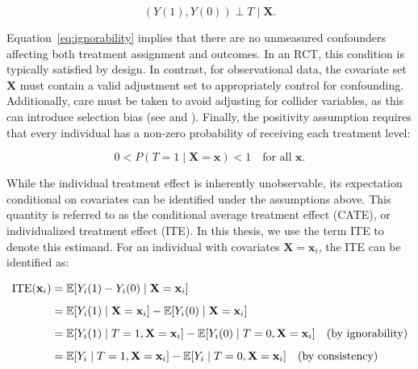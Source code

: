 \begin{equation}
(Y(1), Y(0)) \perp T \mid \mathbf{X}.
\label{eq:ignorability}
\end{equation}

Equation~\ref{eq:ignorability} implies that there are no unmeasured confounders affecting both treatment assignment and outcomes. In an RCT, this condition is typically satisfied by design. In contrast, for observational data, the covariate set $\mathbf{X}$ must contain a valid adjustment set to appropriately control for confounding. Additionally, care must be taken to avoid adjusting for collider variables, as this can introduce selection bias (see \citet{elwert2014} and \citet{hernan2025}). Finally, the positivity assumption requires that every individual has a non-zero probability of receiving each treatment level:

\begin{equation}
0 < P(T = 1 \mid \mathbf{X} = \mathbf{x}) < 1 \quad \text{for all } \mathbf{x}.
\end{equation}

\medskip

While the individual treatment effect is inherently unobservable, its expectation conditional on covariates can be identified under the assumptions above. This quantity is referred to as the conditional average treatment effect (CATE), or individualized treatment effect (ITE). In this thesis, we use the term ITE to denote this estimand. For an individual with covariates \( \mathbf{X} = \mathbf{x}_i \), the ITE can be identified as:

\medskip



\begin{align}
\label{eq:ite}
\text{ITE}(\mathbf{x}_i) &= \mathbb{E}[Y_i(1) - Y_i(0) \mid \mathbf{X} = \mathbf{x}_i] \notag \\[0.5em]
&= \mathbb{E}[Y_i(1) \mid \mathbf{X} = \mathbf{x}_i] - \mathbb{E}[Y_i(0) \mid \mathbf{X} = \mathbf{x}_i] \notag \\[0.5em]
&= \mathbb{E}[Y_i(1) \mid T = 1, \mathbf{X} = \mathbf{x}_i] 
 - \mathbb{E}[Y_i(0) \mid T = 0, \mathbf{X} = \mathbf{x}_i] \quad \text{(by ignorability)} \notag \\[0.5em]
&= \mathbb{E}[Y_i \mid T = 1, \mathbf{X} = \mathbf{x}_i] 
 - \mathbb{E}[Y_i \mid T = 0, \mathbf{X} = \mathbf{x}_i] \quad \text{(by consistency)}
\end{align}



